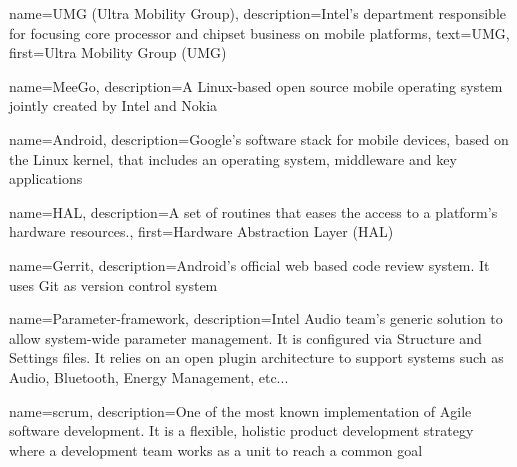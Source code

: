 

%

{
  name=UMG (Ultra Mobility Group),
  description={Intel's department responsible for focusing core
    processor and chipset business on mobile platforms},
  text=UMG,
  first=Ultra Mobility Group (UMG)
}

{
  name=MeeGo\textsuperscript{\texttrademark},
  description={A Linux-based open source mobile operating system
    jointly created by Intel and Nokia}
}

{
  name=Android\textsuperscript{\texttrademark},
  description={Google's software stack for mobile devices, based on
  the Linux kernel, that includes an operating system, middleware and
  key applications}
}

{
  name=HAL,
  description={A set of routines that eases the access to a
  platform's hardware resources.},
  first=Hardware Abstraction Layer (HAL)
}

{
  name=Gerrit,
  description={Android's official web based code review system.
  It uses Git as version control system}
}

{
  name=Parameter-framework,
  description={Intel Audio team's generic solution to allow system-wide
  parameter management. It is configured via Structure and Settings files.
  It relies on an open plugin architecture to support systems such as Audio,
  Bluetooth, Energy Management, etc...
  }
}

{
  name=scrum,
  description={One of the most known implementation of Agile software development.
  It is a flexible, holistic product development strategy where a development team
  works as a unit to reach a common goal}
}

